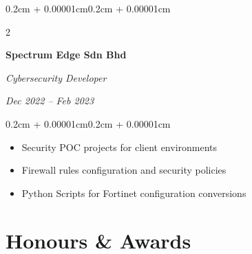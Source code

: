 \documentclass[10pt, letterpaper]{article}
\newenvironment{highlights}{
    \begin{itemize}[
        topsep=0.10cm,
        parsep=0.10cm,
        partopsep=0pt,
        itemsep=0pt,
        leftmargin=0.4cm + 10pt
    ]
}{
    \end{itemize}
}
\newenvironment{onecolentry}{
    \begin{adjustwidth}{0.2cm + 0.00001cm}{0.2cm + 0.00001cm}
}{
    \end{adjustwidth}
}
\newenvironment{twocolentry}[2][]{
    \onecolentry
    \def\secondColumn{#2}
    \setcolumnwidth{\fill, 5.2cm}
    \begin{paracol}{2}
}{
    \switchcolumn \raggedleft \secondColumn
    \end{paracol}
    \endonecolentry
}
\newenvironment{projectentry}{
    \needspace{2.5\baselineskip}
}{
}
\newenvironment{firstprojectentry}{
    \needspace{2\baselineskip}
}{
}
\begin{document}
    \vspace{0.4cm}

    \begin{projectentry}
    \begin{twocolentry}{
        \textit{Dec 2022 -- Feb 2023}
    }
        \textbf{Spectrum Edge Sdn Bhd}

        \textit{Cybersecurity Developer}
    \end{twocolentry}
    \vspace{0.10cm}
    \begin{onecolentry}
        \begin{highlights}
            \item Security POC projects for client environments
            \item Firewall rules configuration and security policies
            \item Python Scripts for Fortinet configuration conversions
        \end{highlights}
    \end{onecolentry}
    \end{projectentry}
    
    \vspace{0.4cm}

    \section{Honours \& Awards}


\end{document}
